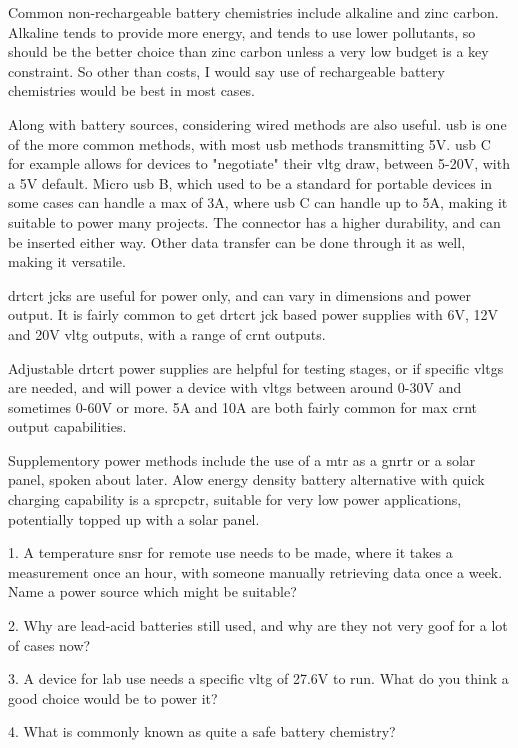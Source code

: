\documentclass[a4paper,11pt]{report}
\newcommand{\Quiz}[1] %
{
\par\noindent %
\phantomsection %
\todo[inline, color=blue!30]{\textbf{#1}} %
\vspace{1em} %
}
\begin{document}
Common non-rechargeable battery chemistries include alkaline and zinc carbon. Alkaline tends to provide more energy, and tends to use lower pollutants, so should be the better choice than zinc carbon unless a very low budget is a key constraint. So other than costs, I would say use of rechargeable battery chemistries would be best in most cases.

Along with battery sources, considering wired methods are also useful. \gls{usb} is one of the more common methods, with most \gls{usb} methods transmitting 5V. \gls{usb} C for example allows for devices to "negotiate" their \gls{vltg} draw, between 5-20V, with a 5V default. Micro \gls{usb} B, which used to be a standard for portable devices in some cases can handle a max of 3A, where \gls{usb} C can handle up to 5A, making it suitable to power many projects. The connector has a higher durability, and can be inserted either way. Other data transfer can be done through it as well, making it versatile.

\gls{drtcrt} \gls{jck}s are useful for power only, and can vary in dimensions and power output. It is fairly common to get \gls{drtcrt} \gls{jck} based power supplies with 6V, 12V and 20V \gls{vltg} outputs, with a range of \gls{crnt} outputs.

Adjustable \gls{drtcrt} power supplies are helpful for testing stages, or if specific \gls{vltg}s are needed, and will power a device with \gls{vltg}s between around 0-30V and sometimes 0-60V or more. 5A and 10A are both fairly common for max \gls{crnt} output capabilities.

Supplementory power methods include the use of a \gls{mtr} as a \gls{gnrtr} or a solar panel, spoken about later. Alow energy density battery alternative with quick charging capability is a \gls{sprcpctr}, suitable for very low power applications, potentially topped up with a solar panel.

\Quiz{Quiz}

1. A temperature \gls{snsr} for remote use needs to be made, where it takes a measurement once an hour, with someone manually retrieving data once a week. Name a power source which might be suitable?

2. Why are lead-acid batteries still used, and why are they not very goof for a lot of cases now?

3. A device for lab use needs a specific \gls{vltg} of 27.6V to run. What do you think a good choice would be to power it?

4. What is commonly known as quite a safe battery chemistry?
\end{document}
